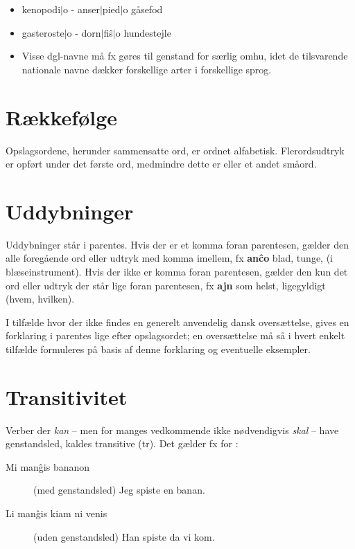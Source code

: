 \begin{description}[style=multiline,nosep,itemsep=3ex,itemindent=0.5cm]
	\begin{itemize}[leftmargin=4em, align=left]
		\item kenopodi{$\vert$}o - anser{$\vert$}pied{$\vert$}o   g{\aa}sefod
		\item gasteroste{$\vert$}o - dorn{$\vert$}fi\^s{$\vert$}o hundestejle
		\item Visse dgl-navne m{\aa} fx g{\o}res til genstand for s{\ae}rlig omhu,
		idet de tilsvarende nationale navne d{\ae}kker forskellige arter i
		forskellige sprog.
	\end{itemize}

\end{description}

\section{R{\ae}kkef{\o}lge}

Opslagsordene, herunder sammensatte ord, er ordnet alfabetisk.
Flerordsudtryk er opf{\o}rt under det f{\o}rste ord, medmindre dette er
 eller et andet sm{\aa}ord.

\section{Uddybninger}

Uddybninger st{\aa}r i parentes. Hvis der er et komma foran parentesen,
g{\ae}lder den alle foreg{\aa}ende ord eller udtryk med komma imellem,
fx \textbf{an\^co} blad, tunge, (i bl{\ae}seinstrument). Hvis der ikke
er komma foran parentesen, g{\ae}lder den kun det ord eller udtryk der
st{\aa}r lige foran parentesen, fx \textbf{ajn} som helst, ligegyldigt
(hvem, hvilken).

I tilf{\ae}lde hvor der ikke findes en generelt anvendelig dansk
overs{\ae}ttelse, gives en forklaring i parentes lige efter
opslagsordet; en overs{\ae}ttelse m{\aa} s{\aa} i hvert enkelt
tilf{\ae}lde formuleres p{\aa} basis af denne forklaring og eventuelle
eksempler.


\section{Transitivitet}
Verber der \textit{kan} -- men for manges vedkommende ikke n{\o}dvendigvis \textit{skal} -- have genstandsled, kaldes transitive (tr). Det g{\ae}lder fx for :

\begin{description}
	\item[Mi man\^gis bananon] (med genstandsled) Jeg spiste en banan.
	\item[Li man\^gis kiam ni venis] (uden genstandsled) Han spiste da vi kom.
\end{description}


